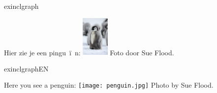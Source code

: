 \documentclass[presentatie.tex]{subfiles}
\begin{document}
\def\langsuffix{}
\lang{\gdef\langsuffix{EN}}{}


\clearrecentlist



\begin{saveblock}{exinclgraph}
	\begin{highlightblock}[linewidth=0.95\textwidth,framexleftmargin=0.25em]
		Hier zie je een pingu~\"i~n:
		\includegraphics[height=2cm]{pinguin.jpg}
		Foto door Sue Flood.
	\end{highlightblock}
\end{saveblock}

\begin{saveblock}{exinclgraphEN}
	\begin{highlightblock}[linewidth=0.95\textwidth,framexleftmargin=0.25em]
		Here you see a penguin:
		\texttt{[image: penguin.jpg]}
		Photo by Sue Flood.
	\end{highlightblock}
\end{saveblock}
\end{document}
